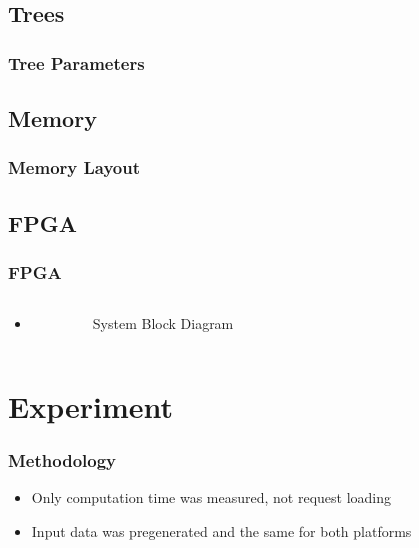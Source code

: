 \documentclass{beamer}
\begin{document}
\subsection{Trees}

\begin{frame}
	\frametitle{Tree Parameters}
\end{frame}


\subsection{Memory}

\begin{frame}
	\frametitle{Memory Layout}
\end{frame}


\subsection{FPGA}

\begin{frame}
	\frametitle{FPGA}
	\begin{columns}
		\begin{itemize}
			\item {}
		\end{itemize}
		
		\begin{figure}
			\resizebox{\textwidth}{!}{}
			\caption{System Block Diagram}
		\end{figure}
	\end{columns}
\end{frame}


\section{Experiment}

\begin{frame}
	\frametitle{Methodology}
	\begin{itemize}
		\item Only computation time was measured, not request loading
		\item Input data was pregenerated and the same for both platforms
	\end{itemize}
\end{frame}
\end{document}
